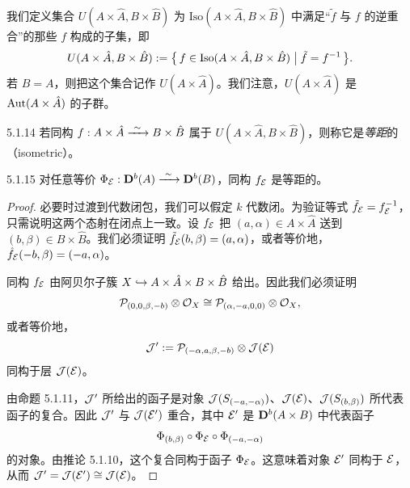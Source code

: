 我们定义集合 $U(A\times\hat A,B\times\hat B)$ 为 $\mathrm{Iso}(A\times\hat A,B\times\hat B)$ 中满足“$\tilde f$ 与 $f$ 的逆重合”的那些 $f$ 构成的子集，即
\begin{equation*}
U(A\times\hat A,B\times\hat B):=\bigl\{\,f\in\mathrm{Iso}(A\times\hat A,B\times\hat B)\bigm|\tilde f=f^{-1}\,\bigr\}.
\end{equation*}
若 $B=A$，则把这个集合记作 $U(A\times\hat A)$。我们注意，$U(A\times\hat A)$ 是 $\operatorname{Aut}(A\times\hat A)$ 的子群。

\begin{definition}{5.1.14}
若同构 $f:A\times\hat A\xrightarrow{\ \sim\ } B\times\hat B$ 属于 $U(A\times\hat A,B\times\hat B)$，则称它是\emph{等距}的（isometric）。
\end{definition}


\begin{proposition}{5.1.15}
对任意等价 $\Phi_{\mathcal{E}}:\mathbf{D}^{b}(A)\xrightarrow{\ \sim\ }\mathbf{D}^{b}(B)$，同构 $f_{\mathcal{E}}$ 是等距的。
\end{proposition}

\begin{proof}
必要时过渡到代数闭包，我们可以假定 $k$ 代数闭。为验证等式 $\tilde f_{\mathcal{E}}=f_{\mathcal{E}}^{-1}$，只需说明这两个态射在闭点上一致。设 $f_{\mathcal{E}}$ 把 $(a,\alpha)\in A\times\hat A$ 送到 $(b,\beta)\in B\times\hat B$。我们必须证明 $\tilde f_{\mathcal{E}}(b,\beta)=(a,\alpha)$，或者等价地，$\hat f_{\mathcal{E}}(-b,\beta)=(-a,\alpha)$。

同构 $f_{\mathcal{E}}$ 由阿贝尔子簇 $X\hookrightarrow A\times\hat A\times B\times\hat B$ 给出。因此我们必须证明
\begin{equation*}
\mathcal{P}_{(0,0,\beta,-b)}\otimes\mathcal{O}_X\cong\mathcal{P}_{(\alpha,-a,0,0)}\otimes\mathcal{O}_X,
\end{equation*}
或者等价地，
\begin{equation*}
\mathcal{J}':=\mathcal{P}_{(-\alpha,a,\beta,-b)}\otimes\mathcal{J}(\mathcal{E})
\end{equation*}
同构于层 $\mathcal{J}(\mathcal{E})$。

由命题 5.1.11，$\mathcal{J}'$ 所给出的函子是对象 $\mathcal{J}(S_{(-a,-\alpha)})$、$\mathcal{J}(\mathcal{E})$、$\mathcal{J}(S_{(b,\beta)})$ 所代表函子的复合。因此 $\mathcal{J}'$ 与 $\mathcal{J}(\mathcal{E}')$ 重合，其中 $\mathcal{E}'$ 是 $\mathbf{D}^{b}(A\times B)$ 中代表函子
\begin{equation*}
\Phi_{(b,\beta)}\circ\Phi_{\mathcal{E}}\circ\Phi_{(-a,-\alpha)}
\end{equation*}
的对象。由推论 5.1.10，这个复合同构于函子 $\Phi_{\mathcal{E}}$。这意味着对象 $\mathcal{E}'$ 同构于 $\mathcal{E}$，从而 $\mathcal{J}'=\mathcal{J}(\mathcal{E}')\cong\mathcal{J}(\mathcal{E})$。
\end{proof}


